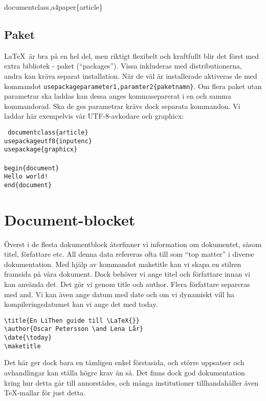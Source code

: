 \tb{}documentclass\lbrack 10pt,a4paper\rbrack\{article\}

\subsection{Paket}
\LaTeX\ är bra på en hel del, men riktigt flexibelt och kraftfullt blir det först med extra bibliotek - paket (``packages''). Vissa inkluderas med distributionerna, andra kan kräva separat installation. När de väl är installerade aktiveras de med kommandot \texttt{\tb{}usepackage\lbrack parameter1,paramter2\rbrack\{paketnamn\}}. Om flera paket utan parametrar ska laddas kan dessa anges kommaseparerat i en och samma kommandorad. Ska de ges parametrar krävs dock separata kommandon. Vi laddar här exempelvis vår UTF-8-avkodare och graphicx:

\texttt{
  \tb{}documentclass\{article\}\\
  \tb{}usepackage\lbrack utf8\rbrack\{inputenc\}\\
  \tb{}usepackage\{graphicx\}\\\\
  \tb{}begin\{document\}\\
  \indent Hello world!\\
  \tb{}end\{document\}
}
\section{Document-blocket} %
Överst i de flesta dokumentblock återfinner vi information om dokumentet, såsom titel, författare etc. All denna data refereras ofta till som ``top matter'' i diverse dokumentation. Med hjälp av kommandot \tb{}maketitle kan vi skapa en stilren framsida på våra dokument. Dock behöver vi ange titel och författare innan vi kan använda det. Det gör vi genom \tb{}title och \tb{}author. Flera författare separeras med \tb{}and. Vi kan även ange datum med \tb{}date och om vi dynamiskt vill ha kompileringsdatumet kan vi ange det med \tb{}today.

\begin{verbatim}
\title{En LiThen guide till \LaTeX{}}
\author{Oscar Petersson \and Lena Lår}
\date{\today}
\maketitle
\end{verbatim}


Det här ger dock bara en tämligen enkel förstasida, och större uppsatser och avhandlingar kan ställa högre krav än så. Det finns dock god dokumentation kring hur detta går till annorstädes, och många institutioner tillhandahåller även \TeX-mallar för just detta.

